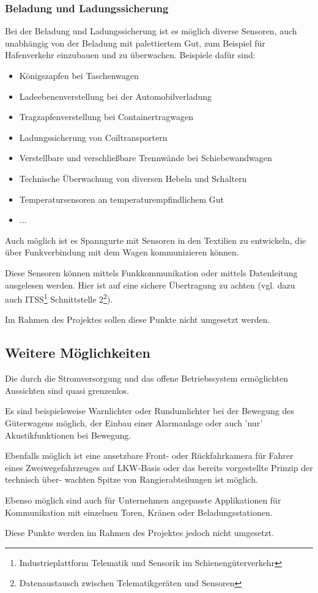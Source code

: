 \subsubsection{Beladung und Ladungssicherung}
Bei der Beladung und Ladungssicherung ist es möglich diverse Sensoren, auch unabhängig von der Beladung mit palettiertem Gut, zum Beispiel für Hafenverkehr einzubauen und zu überwachen. Beispiele dafür sind:
\begin{itemize}
    \item Königszapfen bei Taschenwagen
    \item Ladeebenenverstellung bei der Automobilverladung
    \item Tragzapfenverstellung bei Containertragwagen
    \item Ladungssicherung von Coiltransportern
    \item Verstellbare und verschließbare Trennwände bei Schiebewandwagen
    \item Technische Überwachung von diversen Hebeln und Schaltern
    \item Temperatursensoren an temperaturempfindlichem Gut
    \item ...
\end{itemize}
Auch möglich ist es Spanngurte mit Sensoren in den Textilien zu entwickeln, die über Funkverbindung mit dem Wagen kommunizieren können.\par
Diese Sensoren können mittels Funkkommunikation oder mittels Datenleitung ausgelesen werden. Hier ist auf eine sichere Übertragung zu achten (vgl. dazu auch ITSS\footnote{Industrieplattform Telematik und Sensorik im Schienengüterverkehr} Schnittstelle 2\footnote{Datenaustausch zwischen Telematikgeräten und Sensoren}).\par
Im Rahmen des Projektes sollen diese Punkte nicht umgesetzt werden.

\subsection{Weitere Möglichkeiten}
Die durch die Stromversorgung und das offene Betriebssystem ermöglichten Aussichten sind quasi grenzenlos.\par
Es sind beispielsweise Warnlichter oder Rundumlichter bei der Bewegung des Güterwagens möglich, der Einbau einer Alarmanlage oder auch 'nur' Akustikfunktionen bei Bewegung.\par
Ebenfalls möglich ist eine ansetzbare Front- oder Rückfahrkamera für Fahrer eines Zweiwegefahrzeuges auf LKW-Basis oder das bereits vorgestellte Prinzip der technisch über- wachten Spitze von Rangierabteilungen\cite{RTUS} ist möglich.\par
Ebenso möglich sind auch für Unternehmen angepasste Applikationen für Kommunikation mit einzelnen Toren, Kränen oder Beladungsstationen.\par
Diese Punkte werden im Rahmen des Projektes jedoch nicht umgesetzt.
